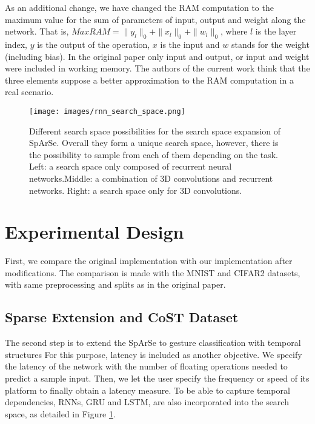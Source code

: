 \documentclass[10pt, a4paper, twocolumn]{article}
\begin{document}
As an additional change, we have changed the RAM computation to the maximum value for the sum of parameters of input, output and weight along the network. That is, $MaxRAM = \|y_{l}\|_{0} + \|x_{l}\|_{0} + \|w_{l}\|_{0}$, where $l$ is the layer index, $y$ is the output of the operation, $x$ is the input and $w$ stands for the weight (including bias). In the original paper only input and output, or input and weight were included in working memory. The authors of the current work think that the three elements suppose a better approximation to the RAM computation in a real scenario.

\begin{figure}
	\centering
	\texttt{[image: images/rnn\_search\_space.png]}
	\caption{Different search space possibilities for the search space expansion of SpArSe. Overall they form a unique search space, however, there is the possibility to sample from each of them depending on the task. Left: a search space only composed of recurrent neural networks.Middle: a combination of 3D convolutions and recurrent networks. Right: a search space only for 3D convolutions.}
	\label{fig:rnnsearchspace}
\end{figure}

\section{Experimental Design}

First, we compare the original implementation with our implementation after modifications. The comparison is made with the MNIST and CIFAR2 \cite{Jose2013} datasets, with same preprocessing and splits as in the original paper.

\subsection{Sparse Extension and CoST Dataset}\label{Dataset}

The second step is to extend the SpArSe to gesture classification with temporal structures For this purpose, latency is included as another objective. We specify the latency of the network with the number of floating operations needed to predict a sample input. Then, we let the user specify the frequency or speed of its platform to finally obtain a latency measure. To be able to capture temporal dependencies, RNNs, GRU and LSTM, are also incorporated into the search space, as detailed in Figure \ref{fig:rnnsearchspace}. 
\end{document}
